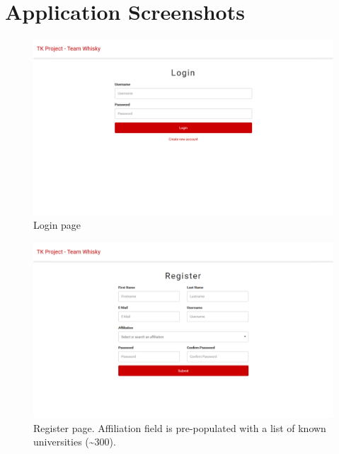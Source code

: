 \documentclass[nochapterpage,nopartpage,noheadingspace,numbersubsubsec,bigchapter,colorback,accentcolor=tud9c,10pt]{tudreport}
\begin{document}
    \clearpage

  \chapter{Application Screenshots}
  \label{ch:appendix:screenshots}

        \begin{figure}[!ht]
            \centering
            \includegraphics[width=\textwidth]{img/ui-login}
            \caption{Login page}
            \label{fig:appendix:screenshots:ui-login}
        \end{figure}

        \begin{figure}[!ht]
            \centering
            \includegraphics[width=\textwidth]{img/ui-register}
            \caption{Register page. Affiliation field is pre-populated with a list of known universities (\textasciitilde300).}
            \label{fig:appendix:screenshots:ui-register}
        \end{figure}
\end{document}
